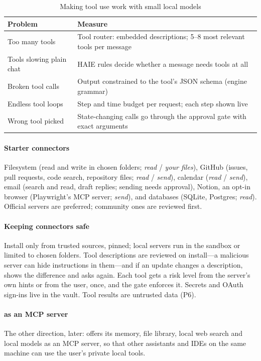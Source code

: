 \begin{table}[t]
\caption{Making tool use work with small local models}
\label{tab:toolfix}
\centering\footnotesize
\begin{tabularx}{\columnwidth}{@{}L{22mm}Y@{}}
\toprule
Problem & Measure \\
\midrule
Too many tools & Tool router: embedded descriptions; 5--8 most relevant tools per message \\
Tools slowing plain chat & HAIE rules decide whether a message needs tools at all \\
Broken tool calls & Output constrained to the tool's JSON schema (engine grammar) \\
Endless tool loops & Step and time budget per request; each step shown live \\
Wrong tool picked & State-changing calls go through the approval gate with exact arguments \\
\bottomrule
\end{tabularx}
\end{table}

\paragraph{Starter connectors} Filesystem (read and write in chosen folders; \emph{read} / \emph{your files}), GitHub (issues, pull requests, code search, repository files; \emph{read} / \emph{send}), calendar (\emph{read} / \emph{send}), email (search and read, draft replies; sending needs approval), Notion, an opt-in browser (Playwright's MCP server; \emph{send}), and databases (SQLite, Postgres; \emph{read}). Official servers are preferred; community ones are reviewed first.

\paragraph{Keeping connectors safe} Install only from trusted sources, pinned; local servers run in the sandbox or limited to chosen folders. Tool descriptions are reviewed on install---a malicious server can hide instructions in them---and if an update changes a description, \hivi{} shows the difference and asks again. Each tool gets a risk level from the server's own hints or from the user, once, and the gate enforces it. Secrets and OAuth sign-ins live in the vault. Tool results are untrusted data (P6).

\paragraph{\hivi{} as an MCP server} The other direction, later: \hivi{} offers its memory, file library, local web search and local models as an MCP server, so that other assistants and IDEs on the same machine can use the user's private local tools.

